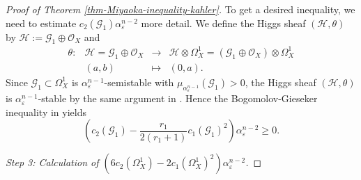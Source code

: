 \documentclass[12pt]{amsart}
\theoremstyle{definition}
\theoremstyle{remark}
\numberwithin{equation}{section}
\begin{document}
\begin{proof}[Proof of Theorem \ref{thm-Miyaoka-inequality-kahler}]
To get a desired inequality, we need to estimate $c_2(\mathcal{G}_1)\alpha_{\varepsilon}^{n-2}$ more detail.
We define the Higgs sheaf $(\mathcal{H}, \theta)$  by 
$\mathcal{H} := \mathcal{G}_1 \oplus \mathcal{O}_{X}$ and 
$$
\begin{array}{cccc}
\theta \colon  & \mathcal{H} = \mathcal{G}_1 \oplus \mathcal{O}_{X} &\rightarrow  
&\mathcal{H} \otimes \Omega_{X}^{1} = (\mathcal{G}_1 \oplus \mathcal{O}_{X}) \otimes \Omega_{X}^{1} \\
	   & (a,b)&\mapsto& (0,a).
\end{array}
$$
Since $\mathcal{G}_1 \subset \Omega_{X}^{1}$ is $\alpha_{\varepsilon}^{n-1}$-semistable with $\mu_{\alpha_{\varepsilon}^{n-1}}(\mathcal{G}_1)>0$, 
the Higgs sheaf $(\mathcal{H}, \theta)$ is $ \alpha_{\varepsilon}^{n-1}$-stable by the same argument in  \cite[Proposition 2.8]{IMM24}. Hence the Bogomolov-Gieseker inequality in \cite{Sim88} yields
\begin{equation}
\label{eq-BG-Higgs}
\left( c_2(\mathcal{G}_1) - \frac{r_1}{2(r_1 +1)}c_1(\mathcal{G}_1)^2 \right)\alpha_{\varepsilon}^{n-2} \ge 0.
\end{equation}

\vspace{0.5\baselineskip}
\emph{Step 3: Calculation of $\left(6c_2(\Omega_{X}^{1}) - 2 c_1(\Omega_{X}^{1})^2 \right)\alpha_{ \varepsilon }^{n-2} $.}
\vspace{0.5\baselineskip}


\end{proof}
\end{document}
